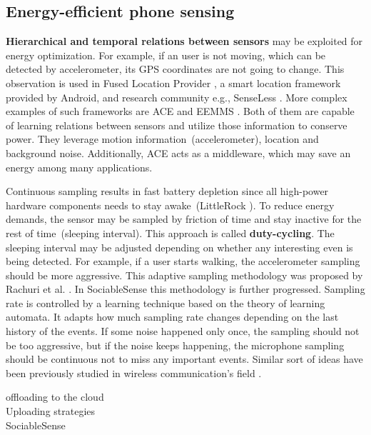 \subsection{Energy-efficient phone sensing}
\textbf{Hierarchical and temporal relations between sensors} may be exploited for energy optimization. For example, if an user is not moving, which can be detected by accelerometer, its GPS coordinates are not going to change. This observation is used in Fused Location Provider \cite{android:locationapi}, a smart location framework provided by Android, and research community e.g., SenseLess \cite{benabdesslem:senseless}. More complex examples of such frameworks are ACE \cite{nath:ace} and EEMMS \cite{wang:eemss}. Both of them are capable of learning relations between sensors and utilize those information to conserve power. They leverage motion information\ (accelerometer), location and background noise. Additionally, ACE acts as a middleware, which may save an energy among many applications.

Continuous sampling results in fast battery depletion since all high-power hardware components needs to stay awake\ (LittleRock \cite{priyantha:littlerock}). To reduce energy demands, the sensor may be sampled by friction of time and stay inactive for the rest of time\ (sleeping interval). This approach is called \textbf{duty-cycling}. The sleeping interval may be adjusted depending on whether any interesting even is being detected. For example, if a user starts walking, the accelerometer sampling should be more aggressive. This adaptive sampling methodology was proposed by Rachuri et al. \cite{rachuri:dynamicsensing}. In SociableSense\cite{rachuri:socialsense} this methodology is further progressed. Sampling rate is controlled by a learning technique based on the theory of learning automata. It adapts how much sampling rate changes depending on the last history of the events. If some noise happened only once, the sampling should not be too aggressive, but if the noise keeps happening, the microphone sampling should be continuous not to miss any important events. Similar sort of ideas have been previously studied in wireless communication's field \cite{deshpande:channeling} \cite{deshpande:refocusing} \cite{deshpande:coordinated}.

offloading to the cloud\\
	Uploading strategies \cite{musolesi:offloading}\\
	SociableSense \cite{rachuri:socialsense} \\

